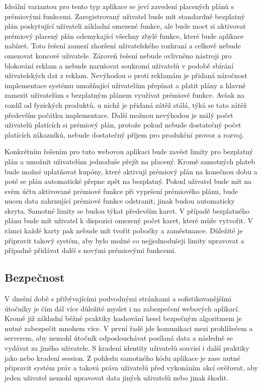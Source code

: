 	Ideální variantou pro tento typ aplikace se jeví zavedení placených plánů s prémiovými funkcemi.
	Zaregistrovaný uživatel bude mít standardně bezplatný plán poskytující uživateli základní omezené funkce, ale
	bude moct si aktivovat prémiový placený plán odemykající všechny zbylé funkce, které bude aplikace nabízet.
	Toto řešení zamezí zhoršení uživatelského rozhraní a celkově nebude omezovat koncové uživatele.
	Zároveň řešení nebude ovlivněno nástroji pro blokování reklam a nebude narušovat soukromí uživatelů v podobě
	sbírání uživatelských dat z reklam.
	Nevýhodou o proti reklamám je přidaná náročnost implementace systému umožňující uživatelům přepínat a platit
	plány a hlavně zamezit uživatelům s bezplatným plánem využívat prémiové funkce.
	Avšak na rozdíl od fyzických produktů, u nichž je přidaná zátěž stálá, týká se tato zátěž především počátku implementace.
	Další možnou nevýhodou je málý počet uživatelů platících si prémiový plán, protože pokud nebude dostatečný počet
	platících zákazníků, nebude dostatečný příjem pro produkční provoz a rozvoj.

	Konkrétním řešením pro tuto webovou aplikaci bude zavést limity pro bezplatný plán a umožnit uživatelům jednoduše
	přejít na placený.
	Kromě samotných plateb bude možné uplatňovat kupóny, které aktivují prémiový plán na konečnou dobu a poté se plán
	automatické přepne zpět na bezplatný.
	Pokud uživatel bude mít na svém účtu aktivované prémiové funkce při vypršení prémiového plánu, bude nucen
	data zahrnující prémiové funkce odstranit, jinak budou automaticky skryta.
	Samotné limity se budou týkat především karet.
	V případě bezplatného plánu bude mít uživatel k dispozici omezený počet karet, které může vytvořit.
	V rámci každé karty pak nebude mít tvořit pobočky a zaměstnance.
	Důležité je připravit takový systém, aby bylo možné co nejjednodušeji limity upravovat a případně přidávat další
	s novými prémiovými funkcemi.

	\subsection{Bezpečnost}

	V dnešní době s přibývajícími podvodnými stránkami a sofistikovanějšími útočníky je čím dál více důležité myslet i
	na zabezpečení webových aplikací.
	Kromě již základní běžné praktiky hashování hesel bezpečným algoritmem je nutné zabezpečit mnohem více.
	V první řadě jde komunikaci mezi prohlížečem a serverem, aby nemohl útočník odposlouchávat posílaná data a následně
	se vydávat za jiného uživatele.
	S kradení identity uživatelů souvisí i další praktiky jako  nebo kradení session.
	Z pohledu samotného kódu aplikace je zase nutné připravit systém práv a taková práva uživatelů před vykonáním
	akcí ověřovat, aby jeden uživatel nemohl upravovat data jiných uživatelů nebo jinak škodit.


